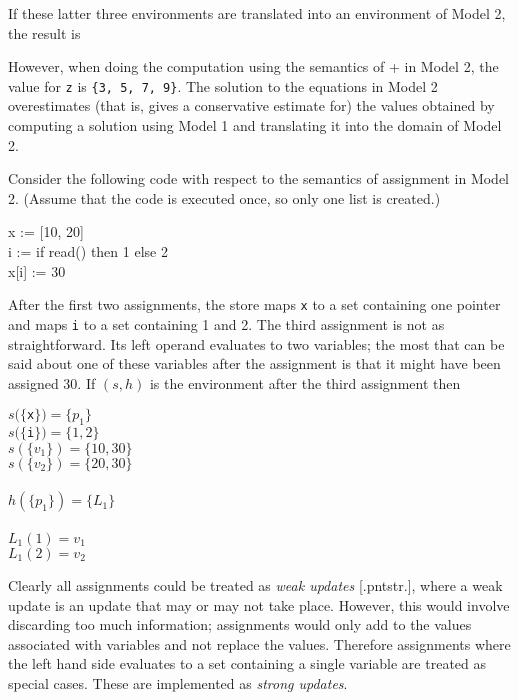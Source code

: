 If these latter three environments are translated into an environment
of Model 2, the result is

\iconline{ \>[x = \{1, 3, 5\}, y = \{2, 4\}, z = \{3, 5, 9\}] }


However, when doing the computation using the semantics of + in Model
2, the value for \texttt{z} is \texttt{\{3, 5, 7, 9\}}. The solution
to the equations in Model 2 overestimates (that is, gives a
conservative estimate for) the values obtained by computing a solution
using Model 1 and translating it into the domain of Model 2.

Consider the following code with respect to the semantics of
assignment in Model 2. (Assume that the code is executed once, so only
one list is created.)

\goodbreak
\begin{iconcode}
\>x := [10, 20]\\
\>i := if read() then 1 else 2\\
\>x[i] := 30\\
\end{iconcode}

After the first two assignments, the store maps \texttt{x} to a set containing
one pointer and maps \texttt{i} to a set containing 1 and 2. The third
assignment is not as straightforward. Its left operand evaluates to
two variables; the most that can be said about one of these variables
after the assignment is that it might have been assigned 30. If $(s, h)$
is the environment after the third assignment then

\goodbreak
\begin{specialcode}{}
\>$s(\{$\texttt{x}$\}) = \{ p_1 \}$\\
\>$s(\{$\texttt{i}$\}) = \{1, 2\}$\\
\>$s(\{v_1\}) = \{10, 30\}$\\
\>$s(\{v_2\}) = \{20, 30\}$\\
\\
\>$h(\{p_1\}) = \{L_1\}$\\
\\
\>$L_1(1) = v_1$\\
\>$L_1(2) = v_2$\\
\end{specialcode}


Clearly all assignments could be treated as \textit{weak updates}
[.pntstr.], where a weak update is an update that may or may not take
place. However, this would involve discarding too much information;
assignments would only add to the values associated with variables and
not replace the values. Therefore assignments where the left hand side
evaluates to a set containing a single variable are treated as special
cases. These are implemented as \textit{strong updates}.


